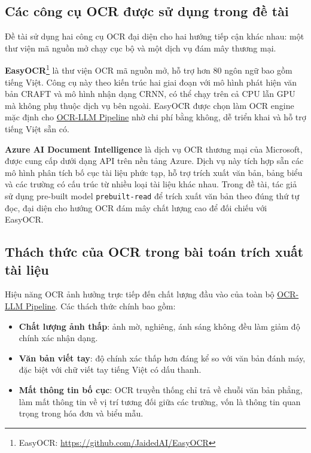 ﻿\documentclass[12pt]{report}
\begin{document}
\subsection{Các công cụ OCR được sử dụng trong đề tài}\label{sec:ocr_tools}

Đề tài sử dụng hai công cụ OCR đại diện cho hai hướng tiếp cận khác nhau: một thư viện mã nguồn mở chạy cục bộ và một dịch vụ đám mây thương mại.

\textbf{EasyOCR}\footnote{EasyOCR: \url{https://github.com/JaidedAI/EasyOCR}} là thư viện OCR mã nguồn mở, hỗ trợ hơn 80 ngôn ngữ bao gồm tiếng Việt. Công cụ này theo kiến trúc hai giai đoạn với mô hình phát hiện văn bản CRAFT và mô hình nhận dạng CRNN, có thể chạy trên cả CPU lẫn GPU mà không phụ thuộc dịch vụ bên ngoài. EasyOCR được chọn làm OCR engine mặc định cho \hyperref[sec:ocr_llm_pipeline]{OCR-LLM Pipeline} nhờ chi phí bằng không, dễ triển khai và hỗ trợ tiếng Việt sẵn có.

\textbf{Azure AI Document Intelligence}\footnotemark{} là dịch vụ OCR thương mại của Microsoft, được cung cấp dưới dạng API trên nền tảng Azure. Dịch vụ này tích hợp sẵn các mô hình phân tích bố cục tài liệu phức tạp, hỗ trợ trích xuất văn bản, bảng biểu và các trường có cấu trúc từ nhiều loại tài liệu khác nhau. Trong đề tài, tác giả sử dụng pre-built model \texttt{prebuilt-read} để trích xuất văn bản theo đúng thứ tự đọc, đại diện cho hướng OCR đám mây chất lượng cao để đối chiếu với EasyOCR.

\subsection{Thách thức của OCR trong bài toán trích xuất tài liệu}\label{sec:ocr_challenges}

Hiệu năng OCR ảnh hưởng trực tiếp đến chất lượng đầu vào của toàn bộ \hyperref[sec:ocr_llm_pipeline]{OCR-LLM Pipeline}. Các thách thức chính bao gồm:

\begin{itemize}
    \item \textbf{Chất lượng ảnh thấp}: ảnh mờ, nghiêng, ánh sáng không đều làm giảm độ chính xác nhận dạng.
    \item \textbf{Văn bản viết tay}: độ chính xác thấp hơn đáng kể so với văn bản đánh máy, đặc biệt với chữ viết tay tiếng Việt có dấu thanh.
    \item \textbf{Mất thông tin bố cục}: OCR truyền thống chỉ trả về chuỗi văn bản phẳng, làm mất thông tin về vị trí tương đối giữa các trường, vốn là thông tin quan trọng trong hóa đơn và biểu mẫu.
\end{itemize}
\end{document}

